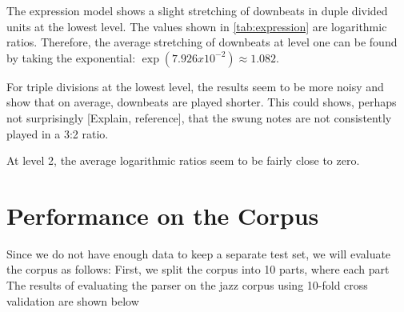 The expression model shows a slight stretching of downbeats in duple divided units at the lowest level. The values shown in \ref{tab:expression} are logarithmic ratios. Therefore, the average stretching of downbeats at level one can be found by taking the exponential: $\exp(7.926 x 10^{-2}) \approx 1.082$. 

For triple divisions at the lowest level, the results seem to be more noisy and show that on average, downbeats are played shorter. This could shows, perhaps not surprisingly [Explain, reference], that the swung notes are not consistently played in a 3:2 ratio.

At level 2, the average logarithmic ratios seem to be fairly close to zero.

\section{Performance on the Corpus}

Since we do not have enough data to keep a separate test set, we will evaluate the corpus as follows: First, we split the corpus into 10 parts, where each part The results of evaluating the parser on the jazz corpus using 10-fold cross validation are shown below
